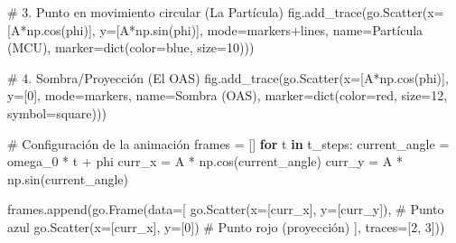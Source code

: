 \documentclass[
  letterpaper,
  DIV=11,
  numbers=noendperiod]{scrreprt}
\newenvironment{Shaded}{\begin{snugshade}}{\end{snugshade}}
\newcommand{\BuiltInTok}[1]{\textcolor[rgb]{0.00,0.23,0.31}{#1}}
\newcommand{\CommentTok}[1]{\textcolor[rgb]{0.37,0.37,0.37}{#1}}
\newcommand{\ControlFlowTok}[1]{\textcolor[rgb]{0.00,0.23,0.31}{\textbf{#1}}}
\newcommand{\DecValTok}[1]{\textcolor[rgb]{0.68,0.00,0.00}{#1}}
\newcommand{\KeywordTok}[1]{\textcolor[rgb]{0.00,0.23,0.31}{\textbf{#1}}}
\newcommand{\NormalTok}[1]{\textcolor[rgb]{0.00,0.23,0.31}{#1}}
\newcommand{\OperatorTok}[1]{\textcolor[rgb]{0.37,0.37,0.37}{#1}}
\newcommand{\StringTok}[1]{\textcolor[rgb]{0.13,0.47,0.30}{#1}}
\begin{document}
\begin{Shaded}
\begin{Highlighting}[]
\CommentTok{\# 3. Punto en movimiento circular (La Partícula)}
\NormalTok{fig.add\_trace(go.Scatter(x}\OperatorTok{=}\NormalTok{[A}\OperatorTok{*}\NormalTok{np.cos(phi)], y}\OperatorTok{=}\NormalTok{[A}\OperatorTok{*}\NormalTok{np.sin(phi)], }
\NormalTok{                         mode}\OperatorTok{=}\StringTok{\textquotesingle{}markers+lines\textquotesingle{}}\NormalTok{, name}\OperatorTok{=}\StringTok{\textquotesingle{}Partícula (MCU)\textquotesingle{}}\NormalTok{,}
\NormalTok{                         marker}\OperatorTok{=}\BuiltInTok{dict}\NormalTok{(color}\OperatorTok{=}\StringTok{\textquotesingle{}blue\textquotesingle{}}\NormalTok{, size}\OperatorTok{=}\DecValTok{10}\NormalTok{)))}

\CommentTok{\# 4. Sombra/Proyección (El OAS)}
\NormalTok{fig.add\_trace(go.Scatter(x}\OperatorTok{=}\NormalTok{[A}\OperatorTok{*}\NormalTok{np.cos(phi)], y}\OperatorTok{=}\NormalTok{[}\DecValTok{0}\NormalTok{], }
\NormalTok{                         mode}\OperatorTok{=}\StringTok{\textquotesingle{}markers\textquotesingle{}}\NormalTok{, name}\OperatorTok{=}\StringTok{\textquotesingle{}Sombra (OAS)\textquotesingle{}}\NormalTok{,}
\NormalTok{                         marker}\OperatorTok{=}\BuiltInTok{dict}\NormalTok{(color}\OperatorTok{=}\StringTok{\textquotesingle{}red\textquotesingle{}}\NormalTok{, size}\OperatorTok{=}\DecValTok{12}\NormalTok{, symbol}\OperatorTok{=}\StringTok{\textquotesingle{}square\textquotesingle{}}\NormalTok{)))}

\CommentTok{\# Configuración de la animación}
\NormalTok{frames }\OperatorTok{=}\NormalTok{ []}
\ControlFlowTok{for}\NormalTok{ t }\KeywordTok{in}\NormalTok{ t\_steps:}
\NormalTok{    current\_angle }\OperatorTok{=}\NormalTok{ omega\_0 }\OperatorTok{*}\NormalTok{ t }\OperatorTok{+}\NormalTok{ phi}
\NormalTok{    curr\_x }\OperatorTok{=}\NormalTok{ A }\OperatorTok{*}\NormalTok{ np.cos(current\_angle)}
\NormalTok{    curr\_y }\OperatorTok{=}\NormalTok{ A }\OperatorTok{*}\NormalTok{ np.sin(current\_angle)}
    
\NormalTok{    frames.append(go.Frame(data}\OperatorTok{=}\NormalTok{[}
\NormalTok{        go.Scatter(x}\OperatorTok{=}\NormalTok{[curr\_x], y}\OperatorTok{=}\NormalTok{[curr\_y]), }\CommentTok{\# Punto azul}
\NormalTok{        go.Scatter(x}\OperatorTok{=}\NormalTok{[curr\_x], y}\OperatorTok{=}\NormalTok{[}\DecValTok{0}\NormalTok{])       }\CommentTok{\# Punto rojo (proyección)}
\NormalTok{    ], traces}\OperatorTok{=}\NormalTok{[}\DecValTok{2}\NormalTok{, }\DecValTok{3}\NormalTok{]))}


\end{Highlighting}
\end{Shaded}
\end{document}
